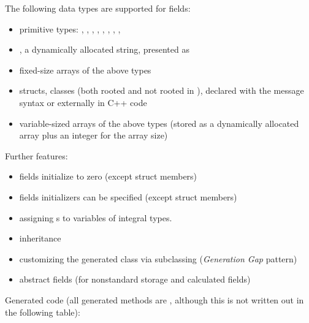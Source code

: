 The following data types are supported for fields:

\begin{itemize}
  \item  primitive types: , , ,
    , , , ,
    , 
  \item  {}, a dynamically allocated string, presented as 
  \item  fixed-size arrays of the above types
  \item  structs, classes (both rooted and not rooted in ),
    declared with the message syntax or externally in C++ code
  \item  variable-sized arrays of the above types (stored as a dynamically
    allocated array plus an integer for the array size)
\end{itemize}

Further features:

\begin{itemize}
  \item  fields initialize to zero (except struct members)
  \item  fields initializers can be specified (except struct members)
  \item  assigning s to variables of integral types.
  \item  inheritance
  \item  customizing the generated class via subclassing (\textit{Generation Gap} pattern)
  \item  abstract fields (for nonstandard storage and calculated fields)
\end{itemize}

Generated code (all generated methods are , although
this is not written out in the following table):


